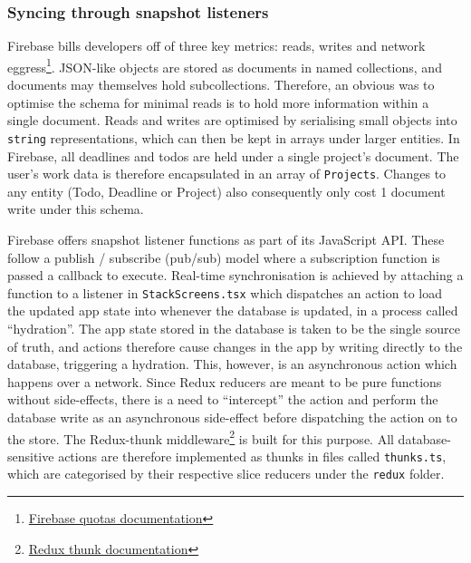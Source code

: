 \subsubsection{Syncing through snapshot listeners}
Firebase bills developers off of three key metrics: reads, writes and network eggress\footnote{\href{https://cloud.google.com/firestore/quotas}{Firebase quotas documentation}}. JSON-like objects are stored as documents in named collections, and documents may themselves hold subcollections. Therefore, an obvious was to optimise the schema for minimal reads is to hold more information within a single document. Reads and writes are optimised by serialising small objects into \texttt{string} representations, which can then be kept in arrays under larger entities. In Firebase, all deadlines and todos are held under a single project's document. The user's work data is therefore encapsulated in an array of \texttt{Projects}. Changes to any entity (Todo, Deadline or Project) also consequently only cost 1 document write under this schema.

Firebase offers snapshot listener functions as part of its JavaScript API. These follow a publish / subscribe (pub/sub) model where a subscription function is passed a callback to execute. Real-time synchronisation is achieved by attaching a function to a listener in \texttt{StackScreens.tsx} which dispatches an action to load the updated app state into whenever the database is updated, in a process called ``hydration''. The app state stored in the database is taken to be the single source of truth, and actions therefore cause changes in the app by writing directly to the database, triggering a hydration. This, however, is an asynchronous action which happens over a network. Since Redux reducers are meant to be pure functions without side-effects, there is a need to ``intercept'' the action and perform the database write as an asynchronous side-effect before dispatching the action on to the store. The Redux-thunk middleware\footnote{\href{https://github.com/reduxjs/redux-thunk}{Redux thunk documentation}} is built for this purpose. All database-sensitive actions are therefore implemented as thunks in files called \texttt{thunks.ts}, which are categorised by their respective slice reducers under the \texttt{redux} folder.


